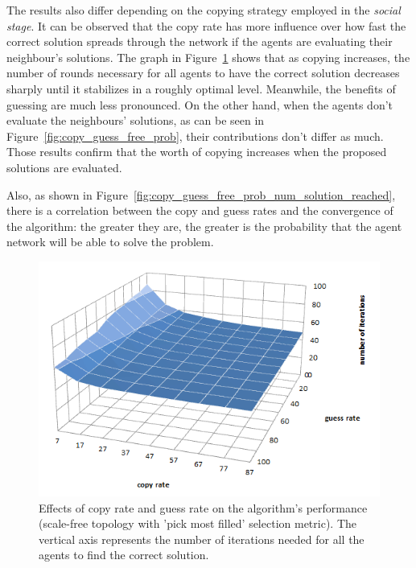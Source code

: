 \documentclass{article}
\begin{document}
The results also differ depending on the copying strategy employed in the \emph{social stage}. It can be observed that the copy rate has more influence over how fast the correct solution spreads through the network if the agents are evaluating their neighbour's solutions. The graph in Figure~\ref{fig:copy_guess_free_most} shows that as copying increases, the number of rounds necessary for all agents to have the correct solution decreases sharply until it stabilizes in a roughly optimal level. Meanwhile, the benefits of guessing are much less pronounced. On the other hand, when the agents don't evaluate the neighbours' solutions, as can be seen in Figure~\ref{fig:copy_guess_free_prob}, their contributions don't differ as much. Those results confirm that the worth of copying increases when the proposed solutions are evaluated.

Also, as shown in Figure~\ref{fig:copy_guess_free_prob_num_solution_reached}, there is a correlation between the copy and guess rates and the convergence of the algorithm: the greater they are, the greater is the probability that the agent network will be able to solve the problem.

\begin{figure}
\includegraphics[scale=0.60]{copy_guess_free_most}
\caption{Effects of copy rate and guess rate on the algorithm's performance (scale-free topology with 'pick most filled' selection metric). The vertical axis represents the number of iterations needed for all the agents to find the correct solution.
}
\label{fig:copy_guess_free_most}
\end{figure}
\end{document}
